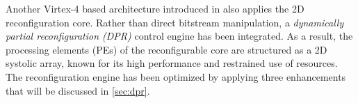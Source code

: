 
Another Virtex-4 based architecture introduced in \cite{dpr} also applies the 2D reconfiguration core. Rather than direct bitstream manipulation, a \emph{dynamically partial reconfiguration (DPR)} control engine has been integrated. As a result, the processing elements (PEs) of the reconfigurable core are structured as a 2D systolic array, known for its high performance and restrained use of resources. The reconfiguration engine has been optimized by applying three enhancements that will be discussed in \ref{sec:dpr}.